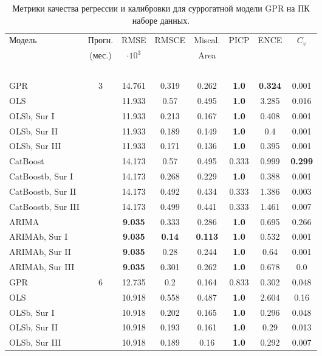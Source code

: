 \begin{longtable}[ht]{|l|c|c|c|c|c|c|c|}
	\caption{
Метрики качества регрессии и калибровки для суррогатной модели GPR на ПК наборе данных.
}
\label{tab:surrogate_results_full_pk}
\\
\hline
Модель & Прогн. & RMSE & RMSCE & Miscal. & PICP & ENCE & $C_{v}$ \\
~ & (мес.) & $\cdot 10^3$ & ~ & Area & ~ & ~ & ~ \\
~ & ~ & ~ & ~ & ~ & ~ & ~ & ~ \\
\hline
GPR & \multirow{5}{*}{3} & 14.761 & 0.319 & 0.262 & \textbf{1.0} & \textbf{0.324} & 0.001 \\
OLS &   & 11.933 & 0.57 & 0.495 & \textbf{1.0} & 3.285 & 0.016 \\
OLSb, Sur I &   & 11.933 & 0.213 & 0.167 & \textbf{1.0} & 0.408 & 0.001 \\
OLSb, Sur II &   & 11.933 & 0.189 & 0.149 & \textbf{1.0} & 0.4 & 0.001 \\
OLSb, Sur III &   & 11.933 & 0.171 & 0.136 & \textbf{1.0} & 0.395 & 0.001 \\
CatBoost &   & 14.173 & 0.57 & 0.495 & 0.333 & 0.999 & \textbf{0.299} \\
CatBoostb, Sur I &   & 14.173 & 0.268 & 0.229 & \textbf{1.0} & 0.388 & 0.001 \\
CatBoostb, Sur II &   & 14.173 & 0.492 & 0.434 & 0.333 & 1.386 & 0.003 \\
CatBoostb, Sur III &   & 14.173 & 0.499 & 0.441 & 0.333 & 1.461 & 0.007 \\
ARIMA &   & \textbf{9.035} & 0.333 & 0.286 & \textbf{1.0} & 0.695 & 0.266 \\
ARIMAb, Sur I &   & \textbf{9.035} & \textbf{0.14} & \textbf{0.113} & \textbf{1.0} & 0.532 & 0.001 \\
ARIMAb, Sur II &   & \textbf{9.035} & 0.28 & 0.244 & \textbf{1.0} & 0.64 & 0.001 \\
ARIMAb, Sur III &   & \textbf{9.035} & 0.301 & 0.262 & \textbf{1.0} & 0.678 & 0.0 \\
\hline
GPR & \multirow{5}{*}{6} & 12.735 & 0.2 & 0.164 & 0.833 & 0.302 & 0.048 \\
OLS &   & 10.918 & 0.558 & 0.487 & \textbf{1.0} & 2.604 & 0.16 \\
OLSb, Sur I &   & 10.918 & 0.202 & 0.165 & \textbf{1.0} & 0.296 & 0.048 \\
OLSb, Sur II &   & 10.918 & 0.193 & 0.161 & \textbf{1.0} & 0.29 & 0.013 \\
OLSb, Sur III &   & 10.918 & 0.189 & 0.16 & \textbf{1.0} & 0.292 & 0.007 \\

\end{longtable}
